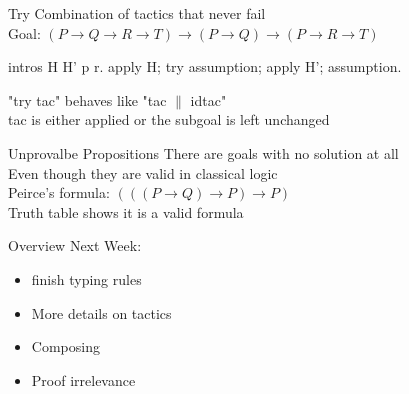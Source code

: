 \begin{frame}[fragile]{Try}
	Combination of tactics that never fail \\
	\pause
	\medskip
	Goal: $(P \rightarrow Q \rightarrow R \rightarrow T) \rightarrow (P \rightarrow Q) \rightarrow (P \rightarrow R \rightarrow T)$
	\pause
	\begin{user}
		intros H H' p r.
		apply H; try assumption; apply H'; assumption.
	\end{user}
	\pause
	"try tac" behaves like "tac $\|$ idtac"\\
	\pause
	\medskip
	tac is either applied or the subgoal is left unchanged
\end{frame}
\begin{frame}[fragile]{Unprovalbe Propositions}
	There are goals with no solution at all\\
	\pause
	\medskip
	Even though they are valid in classical logic\\
	\pause
	\medskip
	Peirce's formula: $(((P \rightarrow Q) \rightarrow P) \rightarrow P)$\\
	\pause
	\medskip
	Truth table shows it is a valid formula
\end{frame}

\begin{frame}[fragile]{Overview}
	Next Week:
	\begin{itemize}
		\item finish typing rules
		\pause
		\item More details on tactics
		\pause
		\item Composing
		\pause
		\item Proof irrelevance
	\end{itemize}
\end{frame}

